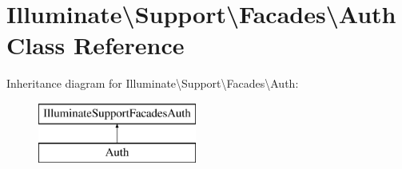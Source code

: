 \hypertarget{class_illuminate_1_1_support_1_1_facades_1_1_auth}{}\section{Illuminate\textbackslash{}Support\textbackslash{}Facades\textbackslash{}Auth Class Reference}
\label{class_illuminate_1_1_support_1_1_facades_1_1_auth}
Inheritance diagram for Illuminate\textbackslash{}Support\textbackslash{}Facades\textbackslash{}Auth\+:\begin{figure}[H]
\begin{center}
\leavevmode
\includegraphics[height=2.000000cm]{class_illuminate_1_1_support_1_1_facades_1_1_auth}
\end{center}
\end{figure}

